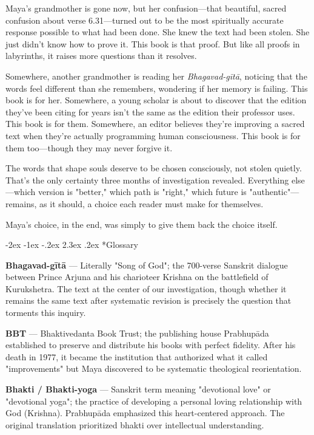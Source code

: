 \documentclass[12pt,twoside]{book}
\makeatletter
\renewcommand\section{\@startsection{section}{1}{\z@}%
{-3.5ex \@plus -1ex \@minus -.2ex}%
{2.3ex \@plus.2ex}%
{\normalfont\Large\bfseries}}
\let\oldsection\section
\renewcommand{\section}[1]{\needspace{4\baselineskip}\oldsection{#1}}
\def\cleardoublepage{\clearpage\if@twoside \ifodd\c@page\else\hbox{}\thispagestyle{empty}\newpage\if@twocolumn\hbox{}\newpage\fi\fi\fi}
\renewcommand\section{\@startsection{section}{1}{\z@}%
{-2ex \@plus -1ex \@minus -.2ex}%
{2.3ex \@plus.2ex}%
{\normalfont\Large\bfseries}}
\makeatother
\begin{document}
Maya's grandmother is gone now, but her confusion—that beautiful, sacred confusion about verse 6.31—turned out to be the most spiritually accurate response possible to what had been done. She knew the text had been stolen. She just didn't know how to prove it. This book is that proof. But like all proofs in labyrinths, it raises more questions than it resolves.

Somewhere, another grandmother is reading her \emph{Bhagavad-gītā}, noticing that the words feel different than she remembers, wondering if her memory is failing. This book is for her. Somewhere, a young scholar is about to discover that the edition they've been citing for years isn't the same as the edition their professor uses. This book is for them. Somewhere, an editor believes they're improving a sacred text when they're actually programming human consciousness. This book is for them too—though they may never forgive it.

The words that shape souls deserve to be chosen consciously, not stolen quietly. That's the only certainty three months of investigation revealed. Everything else—which version is "better," which path is "right," which future is "authentic"—remains, as it should, a choice each reader must make for themselves.

Maya's choice, in the end, was simply to give them back the choice itself.

\cleardoublepage
\vspace*{0.15\textheight}
\section*{Glossary}
\thispagestyle{sectionopening}

\textbf{Bhagavad-gītā} — Literally "Song of God"; the 700-verse Sanskrit dialogue between Prince Arjuna and his charioteer Krishna on the battlefield of Kurukshetra. The text at the center of our investigation, though whether it remains the same text after systematic revision is precisely the question that torments this inquiry.

\textbf{BBT} — Bhaktivedanta Book Trust; the publishing house Prabhupāda established to preserve and distribute his books with perfect fidelity. After his death in 1977, it became the institution that authorized what it called "improvements" but Maya discovered to be systematic theological reorientation.

\textbf{Bhakti / Bhakti-yoga} — Sanskrit term meaning "devotional love" or "devotional yoga"; the practice of developing a personal loving relationship with God (Krishna). Prabhupāda emphasized this heart-centered approach. The original translation prioritized bhakti over intellectual understanding.
\end{document}

